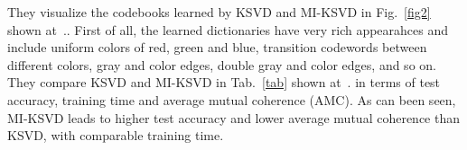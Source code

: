 \documentclass[10pt,twocolumn,letterpaper]{article}
\begin{document}
They visualize the codebooks learned by KSVD and MI-KSVD in Fig.~\ref{fig2} shown at~\cite{multipath}.. First of all, the learned dictionaries have very rich appearahces and include uniform colors of red, green and blue, transition codewords between different colors, gray and color edges, double gray and color edges, and so on. They compare KSVD and MI-KSVD in Tab.~\ref{tab} shown at~\cite{multipath}. in terms of test accuracy, training time and average mutual coherence (AMC). As can been seen, MI-KSVD leads to higher test accuracy and lower average mutual coherence than KSVD, with comparable training time.

{\small


}
\end{document}
